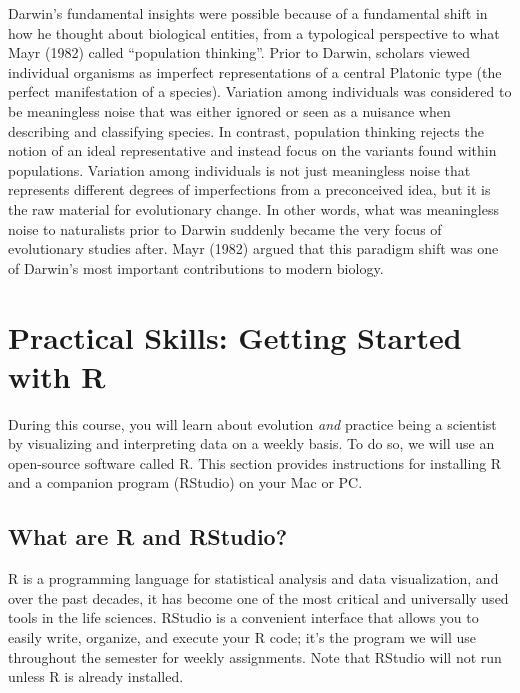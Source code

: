 \documentclass[
]{book}
\begin{document}
Darwin's fundamental insights were possible because of a fundamental shift in how he thought about biological entities, from a typological perspective to what Mayr (1982) called ``population thinking''. Prior to Darwin, scholars viewed individual organisms as imperfect representations of a central Platonic type (the perfect manifestation of a species). Variation among individuals was considered to be meaningless noise that was either ignored or seen as a nuisance when describing and classifying species. In contrast, population thinking rejects the notion of an ideal representative and instead focus on the variants found within populations. Variation among individuals is not just meaningless noise that represents different degrees of imperfections from a preconceived idea, but it is the raw material for evolutionary change. In other words, what was meaningless noise to naturalists prior to Darwin suddenly became the very focus of evolutionary studies after. Mayr (1982) argued that this paradigm shift was one of Darwin's most important contributions to modern biology.

\hypertarget{practical-skills-getting-started-with-r}{%
\section{Practical Skills: Getting Started with R}\label{practical-skills-getting-started-with-r}}

During this course, you will learn about evolution \emph{and} practice being a scientist by visualizing and interpreting data on a weekly basis. To do so, we will use an open-source software called R. This section provides instructions for installing R and a companion program (RStudio) on your Mac or PC.

\hypertarget{what-are-r-and-rstudio}{%
\subsection{What are R and RStudio?}\label{what-are-r-and-rstudio}}

R is a programming language for statistical analysis and data visualization, and over the past decades, it has become one of the most critical and universally used tools in the life sciences. RStudio is a convenient interface that allows you to easily write, organize, and execute your R code; it's the program we will use throughout the semester for weekly assignments. Note that RStudio will not run unless R is already installed.
\end{document}
